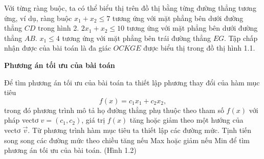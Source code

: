 \documentclass[12pt,a4paper]{report}
\begin{document}
Với từng ràng buộc, ta có thể biểu thị trên đồ thị bằng từng đường thẳng tương ứng, ví dụ, ràng buộc
$x_1 + x_2 \leq 7$
tương ứng với mặt phẳng bên dưới đường thẳng $CD$ trong hình 2.
$2x_1 + x_2 \leq 10$
tương ứng với mặt phẳng bên dưới đường thẳng $AB$.
$x_1 \leq 4$
tương ứng với mặt phẳng bên trái đường thẳng $EG$. Tập chấp nhận được của bài toán là đa giác $OCKGE$ được biểu thị trong đồ thị hình 1.1.

 \textbf{Phương án tối ưu của bài toán}

 Để tìm phương án tối ưu của bài toán ta thiết lập phương thay đổi của hàm mục tiêu
\begin{equation*}
f(x)=c_1x_1+c_2x_2,
\end{equation*}
trong đó phương trình mô tả họ đường thẳng phụ thuộc theo tham số $f(x)$ với pháp vectơ $v=(c_1,c_2)$, giá trị $f(x)$ tăng hoặc giảm theo một hướng của vectơ $\vec{v}$.
 Từ phương trình hàm mục tiêu ta thiết lập các đường mức.
 Tịnh tiến song song các đường mức theo chiều tăng nếu Max hoặc giảm nếu Min để tìm phương án tối ưu của bài toán. (Hình 1.2)
\end{document}
